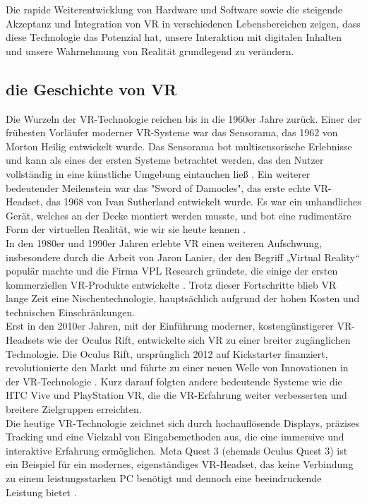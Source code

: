 \noindent
Die rapide Weiterentwicklung von Hardware und Software sowie die steigende Akzeptanz und Integration von VR in verschiedenen Lebensbereichen zeigen, dass diese Technologie das Potenzial hat, unsere Interaktion mit digitalen Inhalten und unsere Wahrnehmung von Realität grundlegend zu verändern. 

\subsection{die Geschichte von VR}
Die Wurzeln der VR-Technologie reichen bis in die 1960er Jahre zurück. Einer der frühesten Vorläufer moderner VR-Systeme war das Sensorama, das 1962 von Morton Heilig entwickelt wurde. Das Sensorama bot multisensorische Erlebnisse und kann als eines der ersten Systeme betrachtet werden, das den Nutzer vollständig in eine künstliche Umgebung eintauchen ließ \cite{heilig1962}. Ein weiterer bedeutender Meilenstein war das "Sword of Damocles", das erste echte VR-Headset, das 1968 von Ivan Sutherland entwickelt wurde. Es war ein unhandliches Gerät, welches an der Decke montiert werden musste, und bot eine rudimentäre Form der virtuellen Realität, wie wir sie heute kennen \cite{sutherland1968}.
\\

\noindent
In den 1980er und 1990er Jahren erlebte VR einen weiteren Aufschwung, insbesondere durch die Arbeit von Jaron Lanier, der den Begriff „Virtual Reality“ populär machte und die Firma VPL Research gründete, die einige der ersten kommerziellen VR-Produkte entwickelte \cite{lanier1992}. Trotz dieser Fortschritte blieb VR lange Zeit eine Nischentechnologie, hauptsächlich aufgrund der hohen Kosten und technischen Einschränkungen.
\\

\noindent
Erst in den 2010er Jahren, mit der Einführung moderner, kostengünstigerer VR-Headsets wie der Oculus Rift, entwickelte sich VR zu einer breiter zugänglichen Technologie. Die Oculus Rift, ursprünglich 2012 auf Kickstarter finanziert, revolutionierte den Markt und führte zu einer neuen Welle von Innovationen in der VR-Technologie \cite{luckey2012}. Kurz darauf folgten andere bedeutende Systeme wie die HTC Vive und PlayStation VR, die die VR-Erfahrung weiter verbesserten und breitere Zielgruppen erreichten.
\\

\noindent
Die heutige VR-Technologie zeichnet sich durch hochauflösende Displays, präzises Tracking und eine Vielzahl von Eingabemethoden aus, die eine immersive und interaktive Erfahrung ermöglichen. Meta Quest 3 (ehemals Oculus Quest 3) ist ein Beispiel für ein modernes, eigenständiges VR-Headset, das keine Verbindung zu einem leistungsstarken PC benötigt und dennoch eine beeindruckende Leistung bietet \cite{meta2023}.

